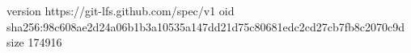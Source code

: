 version https://git-lfs.github.com/spec/v1
oid sha256:98c608ae2d24a06b1b3a10535a147dd21d75c80681edc2cd27cb7fb8c2070c9d
size 174916

